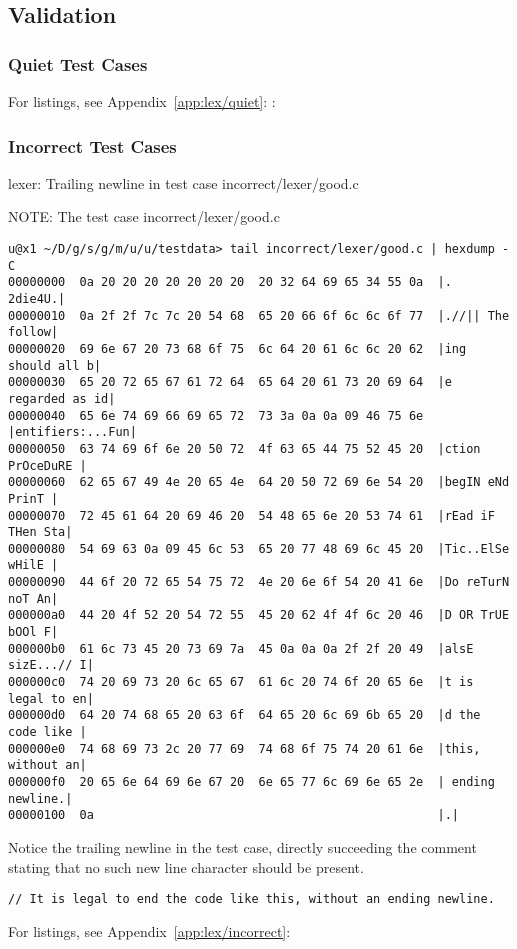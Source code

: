 \subsection{Validation}


\subsubsection{Quiet Test Cases}

For listings, see Appendix~\ref{app:lex/quiet}: :



\subsubsection{Incorrect Test Cases}

lexer: Trailing newline in test case incorrect/lexer/good.c


NOTE: The test case incorrect/lexer/good.c

\begin{verbatim}
u@x1 ~/D/g/s/g/m/u/u/testdata> tail incorrect/lexer/good.c | hexdump -C
00000000  0a 20 20 20 20 20 20 20  20 32 64 69 65 34 55 0a  |.        2die4U.|
00000010  0a 2f 2f 7c 7c 20 54 68  65 20 66 6f 6c 6c 6f 77  |.//|| The follow|
00000020  69 6e 67 20 73 68 6f 75  6c 64 20 61 6c 6c 20 62  |ing should all b|
00000030  65 20 72 65 67 61 72 64  65 64 20 61 73 20 69 64  |e regarded as id|
00000040  65 6e 74 69 66 69 65 72  73 3a 0a 0a 09 46 75 6e  |entifiers:...Fun|
00000050  63 74 69 6f 6e 20 50 72  4f 63 65 44 75 52 45 20  |ction PrOceDuRE |
00000060  62 65 67 49 4e 20 65 4e  64 20 50 72 69 6e 54 20  |begIN eNd PrinT |
00000070  72 45 61 64 20 69 46 20  54 48 65 6e 20 53 74 61  |rEad iF THen Sta|
00000080  54 69 63 0a 09 45 6c 53  65 20 77 48 69 6c 45 20  |Tic..ElSe wHilE |
00000090  44 6f 20 72 65 54 75 72  4e 20 6e 6f 54 20 41 6e  |Do reTurN noT An|
000000a0  44 20 4f 52 20 54 72 55  45 20 62 4f 4f 6c 20 46  |D OR TrUE bOOl F|
000000b0  61 6c 73 45 20 73 69 7a  45 0a 0a 0a 2f 2f 20 49  |alsE sizE...// I|
000000c0  74 20 69 73 20 6c 65 67  61 6c 20 74 6f 20 65 6e  |t is legal to en|
000000d0  64 20 74 68 65 20 63 6f  64 65 20 6c 69 6b 65 20  |d the code like |
000000e0  74 68 69 73 2c 20 77 69  74 68 6f 75 74 20 61 6e  |this, without an|
000000f0  20 65 6e 64 69 6e 67 20  6e 65 77 6c 69 6e 65 2e  | ending newline.|
00000100  0a                                                |.|
\end{verbatim}

Notice the trailing newline in the test case, directly succeeding the comment stating that no such new line character should be present.

\begin{verbatim}
// It is legal to end the code like this, without an ending newline.
\end{verbatim}

For listings, see Appendix~\ref{app:lex/incorrect}: 

